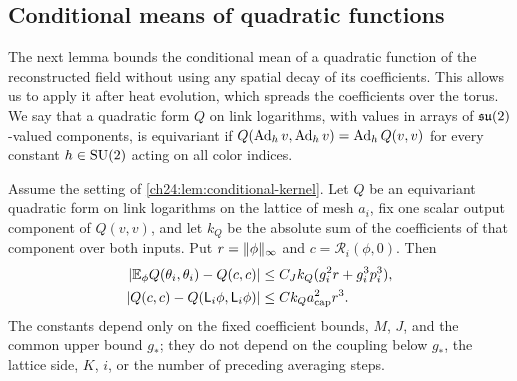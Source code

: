 \subsection{Conditional means of quadratic functions}

The next lemma bounds the conditional mean of a quadratic function of the reconstructed field without using any spatial decay of its coefficients. This allows us to apply it after heat evolution, which spreads the coefficients over the torus. We say that a quadratic form $Q$ on link logarithms, with values in arrays of $\mathfrak{su}(2)$-valued components, is equivariant if $Q(\operatorname{Ad}_hv,\operatorname{Ad}_hv)=\operatorname{Ad}_hQ(v,v)$ for every constant $h\in\mathrm{SU}(2)$ acting on all color indices.

\begin{lemma}\label{ch24:lem:quadratic-mean}
Assume the setting of \cref{ch24:lem:conditional-kernel}. Let $Q$ be an equivariant quadratic form on link logarithms on the lattice of mesh $a_i$, fix one scalar output component of $Q(v,v)$, and let $k_Q$ be the absolute sum of the coefficients of that component over both inputs. Put $r=\lVert \phi\rVert_\infty$ and $c=\mathscr R_i(\phi,0)$. Then
\begin{align}
 \lvert \mathbb E_\phi Q(\theta_i,\theta_i)-Q(c,c)\rvert&\le C_Jk_Q(g_i^2r+g_i^3p_i^3),\label{ch24:eq:unweighted-quantum}\\
 \lvert Q(c,c)-Q(\mathsf L_i\phi,\mathsf L_i\phi)\rvert&\le Ck_Qa_{\mathrm{cap}}^2r^3.\label{ch24:eq:unweighted-classical}
\end{align}
The constants depend only on the fixed coefficient bounds, $M$, $J$, and the common upper bound $g_*$; they do not depend on the coupling below $g_*$, the lattice side, $K$, $i$, or the number of preceding averaging steps.
\end{lemma}

